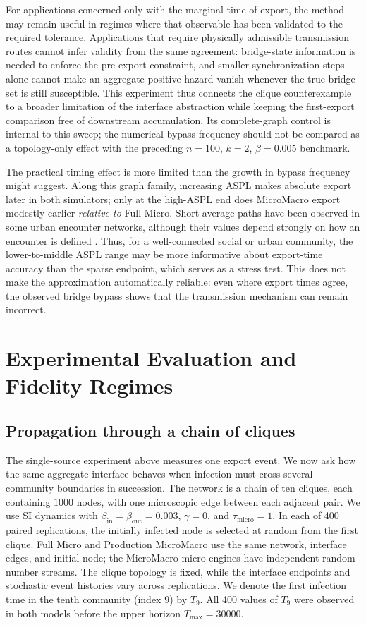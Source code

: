 \documentclass[a4paper,fleqn]{cas-sc}
\begin{document}
For applications concerned only with the marginal time of export, the method may remain useful in regimes where that observable has been validated to the required tolerance. Applications that require physically admissible transmission routes cannot infer validity from the same agreement: bridge-state information is needed to enforce the pre-export constraint, and smaller synchronization steps alone cannot make an aggregate positive hazard vanish whenever the true bridge set is still susceptible. This experiment thus connects the clique counterexample to a broader limitation of the interface abstraction while keeping the first-export comparison free of downstream accumulation. Its complete-graph control is internal to this sweep; the numerical bypass frequency should not be compared as a topology-only effect with the preceding $n=100$, $k=2$, $\beta=0.005$ benchmark.

The practical timing effect is more limited than the growth in bypass frequency might suggest. Along this graph family, increasing ASPL makes absolute export later in both simulators; only at the high-ASPL end does MicroMacro export modestly earlier \emph{relative to} Full Micro. Short average paths have been observed in some urban encounter networks, although their values depend strongly on how an encounter is defined \citep{riascos2017encounter}. Thus, for a well-connected social or urban community, the lower-to-middle ASPL range may be more informative about export-time accuracy than the sparse endpoint, which serves as a stress test. This does not make the approximation automatically reliable: even where export times agree, the observed bridge bypass shows that the transmission mechanism can remain incorrect.

\section{Experimental Evaluation and Fidelity Regimes}

\subsection{Propagation through a chain of cliques}
\label{sec:chain_cliques_propagation}

The single-source experiment above measures one export event. We now ask how the same aggregate interface behaves when infection must cross several community boundaries in succession. The network is a chain of ten cliques, each containing $1000$ nodes, with one microscopic edge between each adjacent pair. We use SI dynamics with $\beta_{\mathrm{in}}=\beta_{\mathrm{out}}=0.003$, $\gamma=0$, and $\tau_{\mathrm{micro}}=1$. In each of 400 paired replications, the initially infected node is selected at random from the first clique. Full Micro and Production MicroMacro use the same network, interface edges, and initial node; the MicroMacro micro engines have independent random-number streams. The clique topology is fixed, while the interface endpoints and stochastic event histories vary across replications. We denote the first infection time in the tenth community (index $9$) by $T_9$. All 400 values of $T_9$ were observed in both models before the upper horizon $T_{\max}=30000$.
\end{document}
